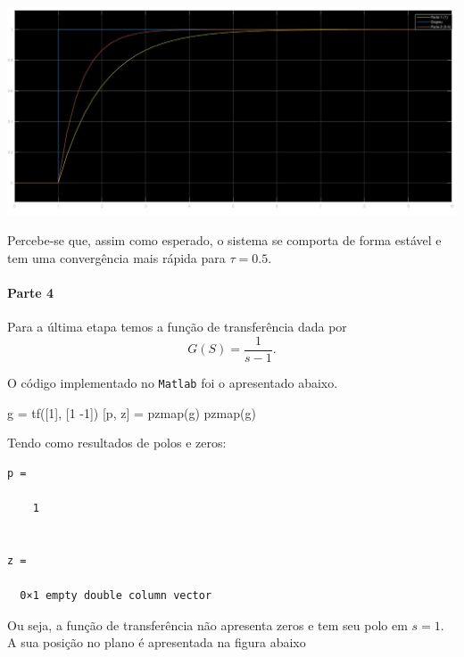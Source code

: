 \documentclass[
]{book}
\newenvironment{Shaded}{\begin{snugshade}}{\end{snugshade}}
\newcommand{\FloatTok}[1]{\textcolor[rgb]{0.00,0.00,0.81}{#1}}
\newcommand{\NormalTok}[1]{#1}
\begin{document}
\includegraphics{Imagens/Lab2/resultSim1.jpg}

Percebe-se que, assim como esperado, o sistema se comporta de forma estável e tem uma convergência mais rápida para \(\tau = 0.5\).

\hypertarget{parte-4}{%
\paragraph{Parte 4}\label{parte-4}}

Para a última etapa temos a função de transferência dada por
\[
G(S)= \frac {1}{s-1}.
\]

O código implementado no \texttt{Matlab} foi o apresentado abaixo.

\begin{Shaded}
\begin{Highlighting}[]
\NormalTok{g = tf([}\FloatTok{1}\NormalTok{], [}\FloatTok{1}\NormalTok{ -}\FloatTok{1}\NormalTok{])}
\NormalTok{[p, z] = pzmap(g)}
\NormalTok{pzmap(g)}
\end{Highlighting}
\end{Shaded}

Tendo como resultados de polos e zeros:

\begin{verbatim}
p =

    1


z =

  0×1 empty double column vector
\end{verbatim}

Ou seja, a função de transferência não apresenta zeros e tem seu polo em \(s = 1\). A sua posição no plano é apresentada na figura abaixo
\end{document}
